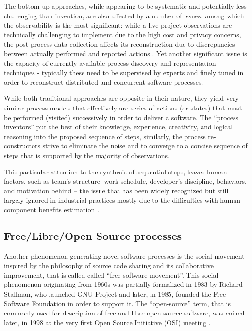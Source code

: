 The bottom-up approaches, while appearing to be systematic and potentially less challenging than invention, 
are also affected by a number of issues, among which the observability is the most significant: 
while a live project observations are technically challenging to implement due to the high cost and 
privacy concerns, the post-process data collection affects its reconstruction due to 
discrepancies between actually performed and reported actions \cite{citeulike:7691059}. 
Yet another significant issue is the capacity of currently available process discovery and representation 
techniques - typically these need to be supervised by experts and finely tuned in order to reconstruct 
distributed and concurrent software processes. 

While both traditional approaches are opposite in their nature, they yield very similar process models that 
effectively are series of actions (or states) that must be performed (visited) successively in order 
to deliver a software. The ``process inventors'' put the best of their knowledge, experience, creativity,
and logical reasoning into the proposed sequence of steps, similarly, the process re-constructors 
strive to eliminate the noise and to converge to a concise sequence of steps that is supported by the 
majority of observations. 

This particular attention to the synthesis of sequential steps, leaves human factors, such as team's 
structure, work schedule, developer's discipline, behaviors, and motivation behind -- 
the issue that has been widely recognized \cite{citeulike:149387} \cite{citeulike:113403} 
\cite{citeulike:205322} \cite{citeulike:12798652} but still largely ignored in industrial practices 
mostly due to the  difficulties with human component benefits estimation 
\cite{citeulike:12798659} \cite{citeulike:12798662} \cite{csdl2-12-11}.

%
%
\subsection{Free/Libre/Open Source processes}\label{sec_floss_processes}
Another phenomenon generating novel software processes is the social movement inspired by the philosophy 
of source code sharing and its collaborative improvement, that is called called ``free-software movement''. 
This social phenomenon originating from 1960s was partially formalized in 1983 by Richard Stallman,
who launched GNU Project and later, in 1985, founded the Free Software Foundation in order to support 
it. The ``open-source'' term, that is commonly used for description of free and libre open source software, 
was coined later, in 1998 at the very first Open Source Initiative (OSI) meeting \cite{osi-history}.


